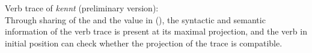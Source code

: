 \eas
Verb trace of \emph{kennt} (preliminary version):\\
\label{le-verbspur-kennt}%
\zs
Through sharing of the \localv and the \dsl value in (), the syntactic and semantic information of the verb trace
is present at its maximal projection, and the verb in initial position can check whether the projection of the trace is compatible.

